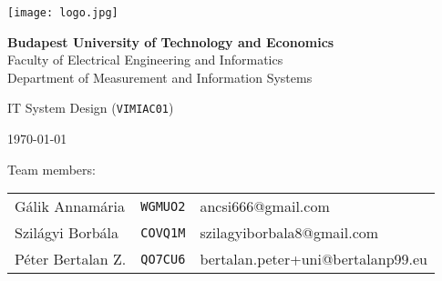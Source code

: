 \begin{titlepage}
	\begin{center}
		\texttt{[image: logo.jpg]}

		\vspace{.2cm}

		\textbf{Budapest University of Technology and Economics} \\
		Faculty of Electrical Engineering and Informatics \\
		Department of Measurement and Information Systems \\

		\vspace{2cm}

		{\huge IT System Design (\texttt{VIMIAC01})}

		\vspace{2cm}

		{\huge \bfseries \thetitle}

		\vspace{.5cm}

		{\Large \theauthor}

		\vspace{.5cm}

		{\Large \today}
	\end{center}

	\vfill{}

	{\large Team members:}

	\vspace{.25cm}

	\begin{tabular}{lll}
		Gálik Annamária &
			\texttt{WGMUO2} &
			ancsi666@gmail.com \\
		Szilágyi Borbála &
			\texttt{COVQ1M} &
			szilagyiborbala8@gmail.com \\
		Péter Bertalan Z. &
			\texttt{QO7CU6} &
			bertalan.peter+uni@bertalanp99.eu
	\end{tabular}

	\vspace{2cm}
\end{titlepage}
